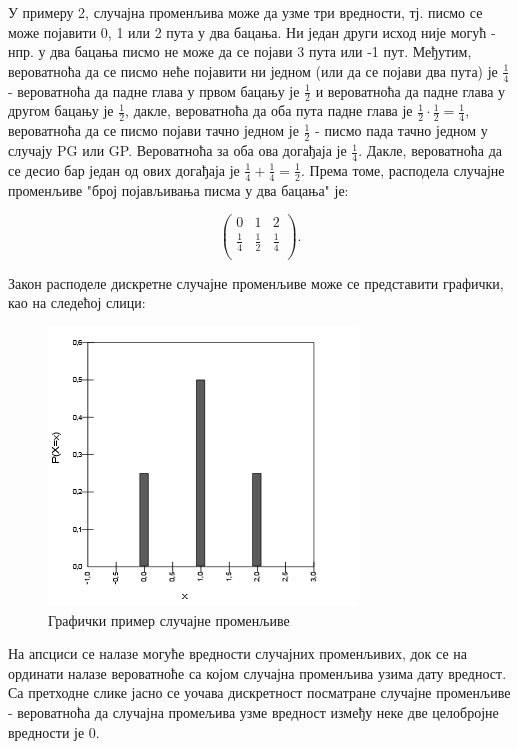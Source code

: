 У примеру 2, случајна променљива може да узме три вредности, тј. писмо се може појавити 0, 1 или 2 пута у два бацања. Ни један други исход није могућ - нпр. у два бацања писмо не може да се појави 3 пута или -1 пут. Међутим, вероватноћа да се писмо неће појавити ни једном (или да се појави два пута) је $\frac{1}{4}$ - вероватноћа да падне глава у првом бацању је $\frac{1}{2}$ и вероватноћа да падне глава у другом бацању је $\frac{1}{2}$, дакле, вероватноћа да оба пута падне глава је $\frac{1}{2} \cdot \frac{1}{2} = \frac{1}{4}$, вероватноћа да се писмо појави тачно једном је $\frac{1}{2}$ - писмо пада тачно једном у случају PG или GP. Вероватноћа за оба ова догађаја је $\frac{1}{4}$. Дакле, вероватноћа да се десио бар један од ових догађаја је  $\frac{1}{4} + \frac{1}{4} = \frac{1}{2}$. Према томе, расподела случајне променљиве "број појављивања писма у два бацања" је:

$$ 
\left(
\begin{array}{ccc}
0 & 1 & 2 \\
\frac{1}{4} & \frac{1}{2} & \frac{1}{4} \\
\end{array}
\right).
$$

Закон расподеле дискретне случајне променљиве може се представити графички, као на следећој слици:

\begin{figure}[H]
    \centering
   \includegraphics[scale=0.8]{./Slike/slika13.png} 
	\caption{Графички пример случајне променљиве}
	\label{fig:slika13}
\end{figure}

На апсциси се налазе могуће вредности случајних променљивих, док се на ординати налазе вероватноће са којом случајна променљива узима дату вредност. Са претходне слике јасно се уочава дискретност посматране случајне променљиве - вероватноћа да случајна промељива узме вредност између неке две целобројне вредности је 0. 
\\
\\

